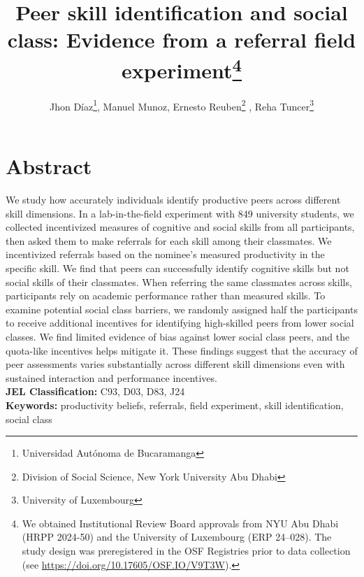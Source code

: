 \documentclass[11pt,a4paper,oneside]{article}
\title{Peer skill identification and social class:
Evidence from a referral field experiment\footnote{We obtained Institutional Review Board approvals from NYU Abu Dhabi (HRPP 2024-50) and the University of Luxembourg (ERP 24–028). The study design was preregistered in the OSF Registries prior to data collection (see \url{https://doi.org/10.17605/OSF.IO/V9T3W}).} }
\author{Jhon Díaz\footnote{Universidad Autónoma de Bucaramanga}, Manuel Munoz\footremember{liser}{Luxembourg Institute of Socio-Economic Research}, Ernesto Reuben\footnote{Division of Social Science, New York University Abu Dhabi} \footrecall{liser}, Reha Tuncer\footnote{University of Luxembourg}}
\begin{document}
\linenumbers 
\maketitle



\section*{Abstract}

We study how accurately individuals identify productive peers across different skill dimensions. In a lab-in-the-field experiment with 849 university students, we collected incentivized measures of cognitive and social skills from all participants, then asked them to make referrals for each skill among their classmates. We incentivized referrals based on the nominee's measured productivity in the specific skill. We find that peers can successfully identify cognitive skills but not social skills of their classmates. When referring the same classmates across skills, participants rely on academic performance rather than measured skills. To examine potential social class barriers, we randomly assigned half the participants to receive additional incentives for identifying high-skilled peers from lower social classes. We find limited evidence of bias against lower social class peers, and the quota-like incentives helps mitigate it. These findings suggest that the accuracy of peer assessments varies substantially across different skill dimensions even with sustained interaction and performance incentives.
\medskip \\
\textbf{JEL Classification:} C93, D03, D83, J24 \\
\textbf{Keywords:} productivity beliefs, referrals, field experiment, skill identification, social class
\end{document}
